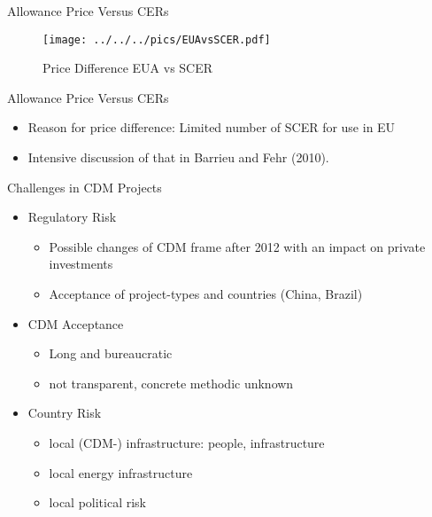 {Allowance Price Versus CERs}
\begin{figure}[h!]
\centering
\texttt{[image: ../../../pics/EUAvsSCER.pdf]}
\caption{Price Difference EUA vs SCER}
\label{fig:EUAvsSCER}
\end{figure}




{Allowance Price Versus CERs}
\begin{itemize}
\item<1-> Reason for price difference: Limited number of SCER for use in EU
\item<2-> Intensive discussion of that in Barrieu and Fehr (2010).
\end{itemize}



{Challenges in CDM Projects}
\begin{itemize}
\item<1-> Regulatory  Risk
\begin{itemize}
\item Possible changes of CDM frame after 2012 with an impact on private investments
\item Acceptance of project-types and countries (China, Brazil)
\end{itemize}
\item<2-> CDM Acceptance
\begin{itemize}
\item Long and bureaucratic
\item not transparent, concrete methodic unknown
\end{itemize}
\item<3-> Country Risk
\begin{itemize}
\item local (CDM-) infrastructure: people, infrastructure
\item local energy infrastructure
\item local political risk
\end{itemize}

\end{itemize}

